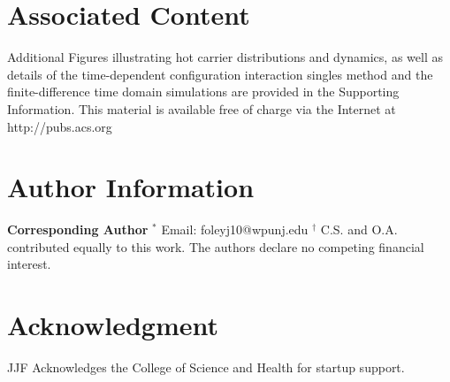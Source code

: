 \documentclass[journal=jpclcd,manuscript=article]{achemso}
\begin{document}
\section{Associated Content}
Additional Figures illustrating hot carrier distributions and dynamics, as well as details of the time-dependent
configuration interaction singles method and the finite-difference time domain simulations are provided in the Supporting 
Information.  This material is available free of charge via the Internet at http://pubs.acs.org

\section{Author Information}
{\bf Corresponding Author}
$^*$ Email: foleyj10@wpunj.edu
\newline
$^{\dagger}$  C.S. and O.A. contributed equally to this work.
\newline
The authors declare no competing financial interest.

\section{Acknowledgment}
JJF Acknowledges the College of Science and Health for startup support.


 
\end{document}
